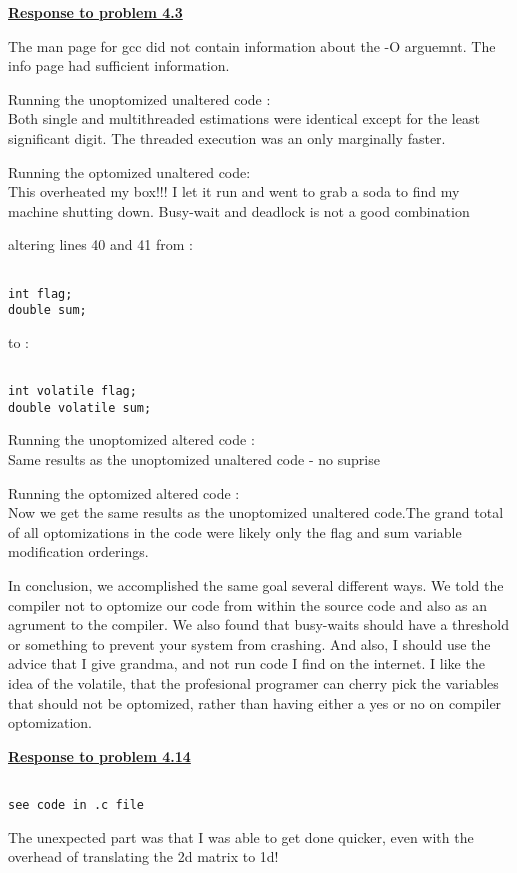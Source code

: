 \documentclass{article}
\begin{document}
\bigskip

\noindent \textbf{\underline{Response to problem 4.3}}

\bigskip

The man page for gcc did not contain information about the -O arguemnt. The info page
had sufficient information. 

Running the unoptomized unaltered code : \\
Both single and multithreaded estimations were identical except for
the least significant digit. The threaded execution was an only
marginally faster.

Running the optomized unaltered code: \\
This overheated my box!!! I let it run and went to grab a soda to
find my machine shutting down. Busy-wait and deadlock is not a good combination

\bigskip

\noindent altering lines 40 and 41 from :

\begin{lstlisting}

int flag;
double sum;

\end{lstlisting}

\noindent to : 

\begin{lstlisting}

int volatile flag;
double volatile sum;

\end{lstlisting}

Running the unoptomized altered code : \\
Same results as the unoptomized unaltered code - no suprise

Running the optomized altered code : \\
Now we get the same results as the unoptomized unaltered code.The grand
total of all optomizations in the code were likely only the flag and sum
variable modification orderings.

\bigskip
In conclusion, we accomplished the same goal several different ways.
We told the compiler not to optomize our code from within the source
code and also as an agrument to the compiler. We also found that busy-waits
should have a threshold or something to prevent your system from crashing.
And also, I should use the advice that I give grandma, and not run code
I find on the internet. I like the idea of the volatile, that the profesional programer can cherry
pick the variables that should not be optomized, rather than having either a
yes or no on compiler optomization. 

\break

\noindent \textbf{\underline{Response to problem 4.14}}

\bigskip

\begin{lstlisting}

see code in .c file

\end{lstlisting}

The unexpected part was that I was able to get done quicker, even with the overhead of translating
the 2d matrix to 1d!
\end{document}
